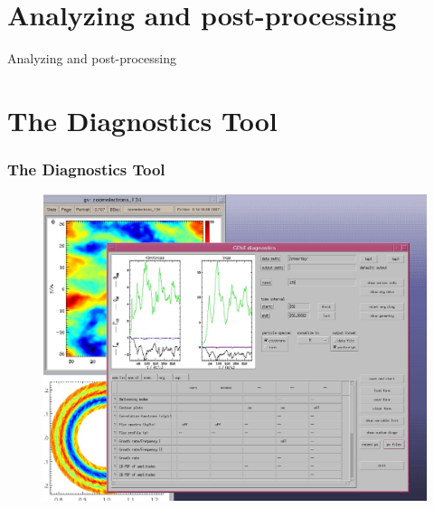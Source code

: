 \documentclass[9pt]{beamer}
\begin{document}
\section{Analyzing and post-processing}

\begin{frame}[plain]

\begin{center}

\begin{exampleblock}

\begin{center}
\LARGE
Analyzing and post-processing%
\end{center}
\end{exampleblock}

\end{center}
\end{frame}


\section{The Diagnostics Tool}

\begin{frame}
  \frametitle{The Diagnostics Tool}

\begin{figure}
\includegraphics[height=0.6\textwidth]{figs/diag_screenshot.jpg}
\end{figure}

\end{frame}
\end{document}
